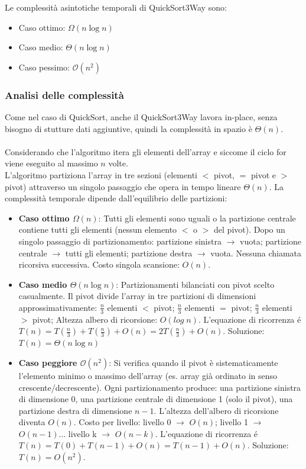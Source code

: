 \documentclass[a4paper, 11pt]{article}
\begin{document}
\bigskip

Le complessità asintotiche temporali di QuickSort3Way sono:
\begin{itemize}
    \item Caso ottimo: $\Omega(n\log n)$
    \item Caso medio: $\Theta(n\log n)$
    \item Caso pessimo: $\mathcal{O}(n^2)$
\end{itemize}

\subsubsection{Analisi delle complessità}
Come nel caso di QuickSort, anche il QuickSort3Way lavora in-place, senza bisogno di stutture dati aggiuntive, quindi la complessità in spazio è $\Theta(n)$.\\\\
Considerando che l'algoritmo itera gli elementi dell'array e siccome il ciclo for viene eseguito al massimo $n$ volte.\\
L'algoritmo partiziona l'array in tre sezioni (elementi $<$ pivot, $=$ pivot e $>$ pivot) attraverso un singolo passaggio che opera in tempo lineare $\Theta(n)$. La complessità temporale dipende dall'equilibrio delle partizioni:
\begin{itemize}
    \item \textbf{Caso ottimo $\Omega(n)$}: Tutti gli elementi sono uguali o la partizione centrale contiene tutti gli elementi (nessun elemento $<$ o $>$ del pivot). Dopo un singolo passaggio di partizionamento: partizione sinistra $\rightarrow$ vuota; partizione centrale $\rightarrow$ tutti gli elementi; partizione destra $\rightarrow$ vuota. Nessuna chiamata ricorsiva successiva. Costo singola scansione: $O(n)$.
    \item \textbf{Caso medio $\Theta(n \log n)$}: Partizionamenti bilanciati con pivot scelto casualmente. Il pivot divide l'array in tre partizioni di dimensioni approssimativamente: $\frac{n}{3}$ elementi $<$ pivot; $\frac{n}{3}$ elementi $=$ pivot; $\frac{n}{3}$ elementi $>$ pivot; Altezza albero di ricorsione: $O(log\;n)$. L'equazione di ricorrenza é $T(n) = T\left(\frac{n}{3}\right) + T\left(\frac{n}{3}\right) + O(n) = 2T\left(\frac{n}{3}\right) + O(n)$. Soluzione: $T(n) = \Theta(n \log n)$
    \item \textbf{Caso peggiore $\mathcal{O}(n^2)$}: Si verifica quando il pivot è sistematicamente l'elemento minimo o massimo dell'array (es. array già ordinato in senso crescente/decrescente). Ogni partizionamento produce: una partizione sinistra di dimensione 0, una partizione centrale di dimensione 1 (solo il pivot), una partizione destra di dimensione $n-1$. L'altezza dell'albero di ricorsione diventa $O(n)$. Costo per livello: livello 0 $\rightarrow$ $O(n)$; livello 1 $\rightarrow$ $O(n-1)$... livello k $\rightarrow$ $O(n-k)$. L'equazione di ricorrenza é $T(n) = T(0) + T(n-1) + O(n) = T(n-1) + O(n)$. Soluzione: $T(n) = O(n^2)$.
\end{itemize}
\end{document}
